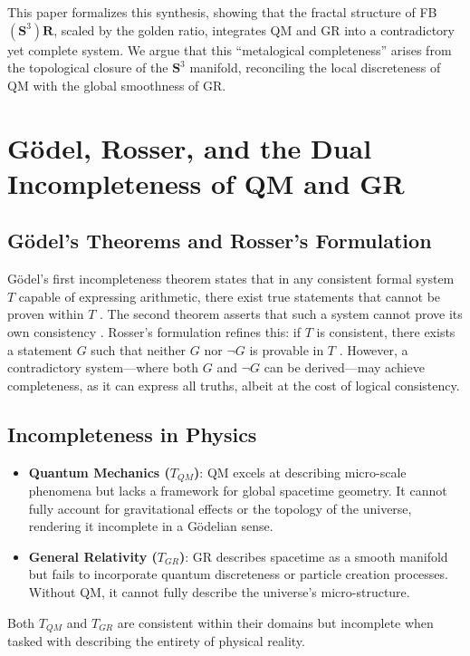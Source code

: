 \documentclass[a4paper,12pt]{article}
\begin{document}
This paper formalizes this synthesis, showing that the fractal structure of FB $\left(\mathbf{S}^3\right)\mathbf{R}$, scaled by the golden ratio, integrates QM and GR into a contradictory yet complete system. We argue that this ``metalogical completeness'' arises from the topological closure of the $\mathbf{S}^3$ manifold, reconciling the local discreteness of QM with the global smoothness of GR.

\section{Gödel, Rosser, and the Dual Incompleteness of QM and GR}

\subsection{Gödel's Theorems and Rosser's Formulation}
Gödel's first incompleteness theorem states that in any consistent formal system $T$ capable of expressing arithmetic, there exist true statements that cannot be proven within $T$ \cite{Godel1931}. The second theorem asserts that such a system cannot prove its own consistency \cite{Godel1931}. Rosser's formulation refines this: if $T$ is consistent, there exists a statement $G$ such that neither $G$ nor $\neg G$ is provable in $T$ \cite{Rosser1936}. However, a contradictory system---where both $G$ and $\neg G$ can be derived---may achieve completeness, as it can express all truths, albeit at the cost of logical consistency.

\subsection{Incompleteness in Physics}
\begin{itemize}
    \item \textbf{Quantum Mechanics ($T_{QM}$)}: QM excels at describing micro-scale phenomena but lacks a framework for global spacetime geometry. It cannot fully account for gravitational effects or the topology of the universe, rendering it incomplete in a Gödelian sense.
    \item \textbf{General Relativity ($T_{GR}$)}: GR describes spacetime as a smooth manifold but fails to incorporate quantum discreteness or particle creation processes. Without QM, it cannot fully describe the universe's micro-structure.
\end{itemize}
Both $T_{QM}$ and $T_{GR}$ are consistent within their domains but incomplete when tasked with describing the entirety of physical reality.
\end{document}
